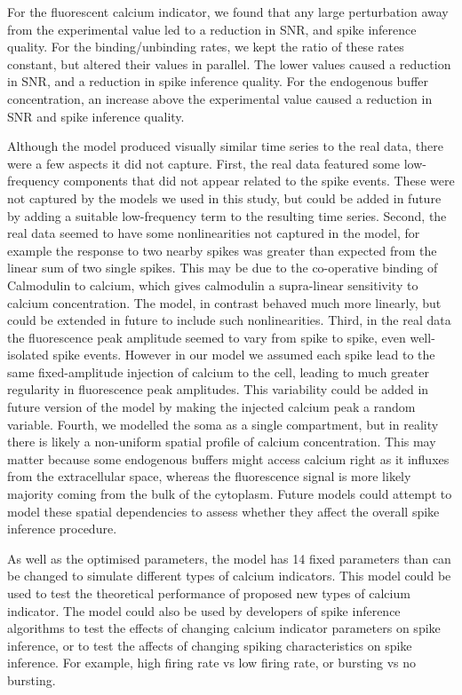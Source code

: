 \documentclass[a4paper,12pt]{article}
\theoremstyle{definition}
\begin{document}
For the fluorescent calcium indicator, we found that any large perturbation away from the experimental value led to a reduction in SNR, and spike inference quality. For the binding/unbinding rates, we kept the ratio of these rates constant, but altered their values in parallel. The lower values caused a reduction in SNR, and a reduction in spike inference quality. For the endogenous buffer concentration, an increase above the experimental value caused a reduction in SNR and spike inference quality. 

Although the model produced visually similar time series to the real data, there were a few aspects it did not capture. First, the real data featured some low-frequency components that did not appear related to the spike events. These were not captured by the models we used in this study, but could be added in future by adding a suitable low-frequency term to the resulting time series. Second, the real data seemed to have some nonlinearities not captured in the model, for example the response to two nearby spikes was greater than expected from the linear sum of two single spikes. This may be due to the co-operative binding of Calmodulin to calcium, which gives calmodulin a supra-linear sensitivity to calcium concentration. The model, in contrast behaved much more linearly, but could be extended in future to include such nonlinearities. Third, in the real data the fluorescence peak amplitude seemed to vary from spike to spike, even well-isolated spike events. However in our model we assumed each spike lead to the same fixed-amplitude injection of calcium to the cell, leading to much greater regularity in fluorescence peak amplitudes. This variability could be added in future version of the model by making the injected calcium peak a random variable. Fourth, we modelled the soma as a single compartment, but in reality there is likely a non-uniform spatial profile of calcium concentration. This may matter because some endogenous buffers might access calcium right as it influxes from the extracellular space, whereas the fluorescence signal is more likely majority coming from the bulk of the cytoplasm. Future models could attempt to model these spatial dependencies to assess whether they affect the overall spike inference procedure.

As well as the optimised parameters, the model has 14 fixed parameters than can be changed to simulate different types of calcium indicators. This model could be used to test the theoretical performance of proposed new types of calcium indicator. 
The model could also be used by developers of spike inference algorithms to test the effects of changing calcium indicator parameters on spike inference, or to test the affects of changing spiking characteristics on spike inference. For example, high firing rate vs low firing rate, or bursting vs no bursting. 
\end{document}
